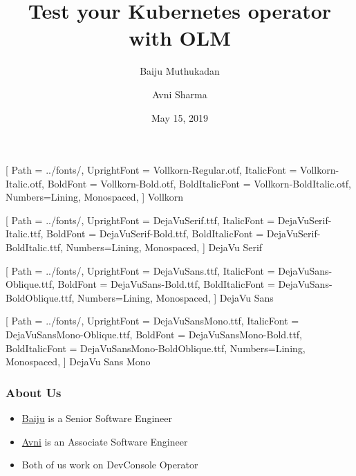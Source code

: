 \documentclass[aspectratio=169]{beamer}
\title{Test your Kubernetes operator with OLM}
\author{Baiju Muthukadan \and Avni Sharma}
\date{May 15, 2019}
\begin{document}
\beamertemplatenavigationsymbolsempty

\setmainfont
[ Path = ../fonts/,
UprightFont = DejaVuSerif.ttf,
ItalicFont = DejaVuSerif-Italic.ttf,
BoldFont = DejaVuSerif-Bold.ttf,
BoldItalicFont = DejaVuSerif-BoldItalic.ttf,
Numbers={Lining, Monospaced},
] {DejaVu Serif}

\setsansfont
[ Path = ../fonts/,
UprightFont = DejaVuSans.ttf,
ItalicFont = DejaVuSans-Oblique.ttf,
BoldFont = DejaVuSans-Bold.ttf,
BoldItalicFont = DejaVuSans-BoldOblique.ttf,
Numbers={Lining, Monospaced},
] {DejaVu Sans}

\setmonofont
[ Path = ../fonts/,
UprightFont = DejaVuSansMono.ttf,
ItalicFont = DejaVuSansMono-Oblique.ttf,
BoldFont = DejaVuSansMono-Bold.ttf,
BoldItalicFont = DejaVuSansMono-BoldOblique.ttf,
Numbers={Lining, Monospaced},
] {DejaVu Sans Mono}


\newfontfamily{\vollkorn}
[ Path = ../fonts/,
UprightFont = Vollkorn-Regular.otf,
ItalicFont = Vollkorn-Italic.otf,
BoldFont = Vollkorn-Bold.otf,
BoldItalicFont = Vollkorn-BoldItalic.otf,
Numbers={Lining, Monospaced},
] {Vollkorn}

\newfontfamily{\dejavuserif}
[ Path = ../fonts/,
UprightFont = DejaVuSerif.ttf,
ItalicFont = DejaVuSerif-Italic.ttf,
BoldFont = DejaVuSerif-Bold.ttf,
BoldItalicFont = DejaVuSerif-BoldItalic.ttf,
Numbers={Lining, Monospaced},
] {DejaVu Serif}

\newfontfamily{\dejavusans}
[ Path = ../fonts/,
UprightFont = DejaVuSans.ttf,
ItalicFont = DejaVuSans-Oblique.ttf,
BoldFont = DejaVuSans-Bold.ttf,
BoldItalicFont = DejaVuSans-BoldOblique.ttf,
Numbers={Lining, Monospaced},
] {DejaVu Sans}

\newfontfamily{\dejavumono}
[ Path = ../fonts/,
UprightFont = DejaVuSansMono.ttf,
ItalicFont = DejaVuSansMono-Oblique.ttf,
BoldFont = DejaVuSansMono-Bold.ttf,
BoldItalicFont = DejaVuSansMono-BoldOblique.ttf,
Numbers={Lining, Monospaced},
] {DejaVu Sans Mono}

\frame{\titlepage}

\begin{frame}
  \frametitle{About Us}

  \begin{itemize}
  \item \href{https://github.com/Avni-Sharma}{Baiju} is a Senior Software Engineer
  \item \href{https://github.com/baijum}{Avni} is an Associate Software Engineer
  \item Both of us work on DevConsole Operator
  \end{itemize}

\end{frame}
\end{document}
